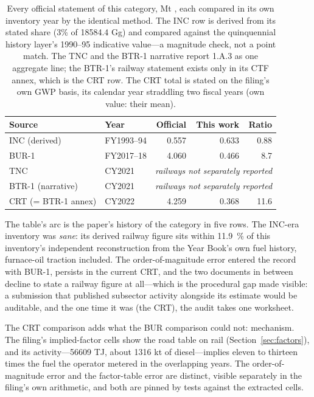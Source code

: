 \begin{table}[htbp]
\centering
\footnotesize
\begin{tabular}{@{}llrrr@{}}
\toprule
\textbf{Source} & \textbf{Year} & \textbf{Official} & \textbf{This work} & \textbf{Ratio} \\
\midrule
INC (derived)  & FY1993--94 & 0.557 & 0.633 & 0.88 \\
BUR-1          & FY2017--18 & 4.060 & 0.466 & 8.7  \\
TNC            & CY2021 & \multicolumn{3}{l}{\emph{railways not separately reported}} \\
BTR-1 (narrative) & CY2021 & \multicolumn{3}{l}{\emph{railways not separately reported}} \\
CRT (= BTR-1 annex) & CY2022 & 4.259 & 0.368 & 11.6 \\
\bottomrule
\end{tabular}
\caption{Every official statement of this category, Mt \COe{}, each compared in its own
inventory year by the identical method. The INC row is derived from its stated share
(3\% of \num{18584.4} Gg) and compared against the quinquennial history layer's
1990--95 indicative value---a magnitude check, not a point match. The TNC and the BTR-1
narrative report 1.A.3 as one aggregate line; the BTR-1's railway statement exists only
in its CTF annex, which is the CRT row. The CRT total is stated on the filing's own GWP
basis, its calendar year straddling two fiscal years (own value: their mean).}
\label{tab:official}
\end{table}

The table's arc is the paper's history of the category in five rows. The INC-era
inventory was \emph{sane}: its derived railway figure sits within \SI{11.9}{\percent} of this
inventory's independent reconstruction from the Year Book's own fuel history,
furnace-oil traction included. The order-of-magnitude error entered the record with
BUR-1, persists in the current CRT, and the two documents in between decline to state a
railway figure at all---which is the procedural gap made visible: a submission that
published subsector activity alongside its estimate would be auditable, and the one time
it was (the CRT), the audit takes one worksheet.

The CRT comparison adds what the BUR comparison could not: mechanism. The filing's
implied-factor cells show the road table on rail (Section~\ref{sec:factors}), and its
activity---\num{56609} TJ, about \num{1316} kt of diesel---implies eleven to thirteen
times the fuel the operator metered in the overlapping years. The order-of-magnitude
error and the factor-table error are distinct, visible separately in the filing's own
arithmetic, and both are pinned by tests against the extracted cells.


